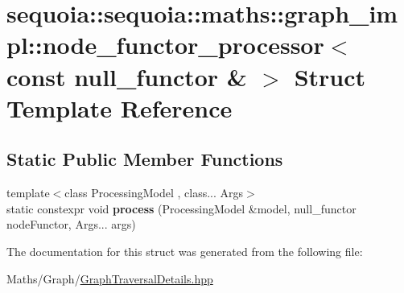\hypertarget{structsequoia_1_1sequoia_1_1maths_1_1graph__impl_1_1node__functor__processor_3_01const_01null__functor_01_6_01_4}{}\section{sequoia\+::sequoia\+::maths\+::graph\+\_\+impl\+::node\+\_\+functor\+\_\+processor$<$ const null\+\_\+functor \& $>$ Struct Template Reference}
\label{structsequoia_1_1sequoia_1_1maths_1_1graph__impl_1_1node__functor__processor_3_01const_01null__functor_01_6_01_4}
\subsection*{Static Public Member Functions}
\begin{DoxyCompactItemize}
\item 
\mbox{\label{structsequoia_1_1sequoia_1_1maths_1_1graph__impl_1_1node__functor__processor_3_01const_01null__functor_01_6_01_4_a0880f4a7c69c9b3fd61c49ee7cda70af}} 
{\footnotesize template$<$class Processing\+Model , class... Args$>$ }\\static constexpr void {\bfseries process} (Processing\+Model \&model, null\+\_\+functor node\+Functor, Args... args)
\end{DoxyCompactItemize}


The documentation for this struct was generated from the following file\+:\begin{DoxyCompactItemize}
\item 
Maths/\+Graph/\mbox{\hyperlink{_graph_traversal_details_8hpp}{Graph\+Traversal\+Details.\+hpp}}\end{DoxyCompactItemize}
